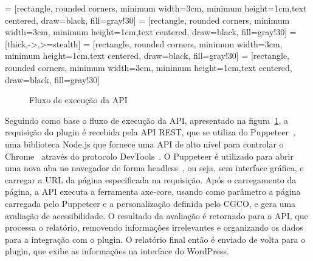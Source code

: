 \documentclass[
    12pt,
    a4paper,
    oneside,
    brazil,
    english
]{article}
\begin{document}
 = [rectangle, rounded corners, minimum width=3cm,
minimum height=1cm,text centered, draw=black, fill=gray!30]
 = [rectangle, rounded corners, minimum width=3cm,
minimum height=1cm,text centered, draw=black, fill=gray!30]
 = [thick,->,>=stealth]
 = [rectangle, rounded corners, minimum width=3cm,
minimum height=1cm,text centered, draw=black, fill=gray!30]
 = [rectangle, rounded corners, minimum width=3cm,
minimum height=1cm,text centered, draw=black, fill=gray!30]
\begin{figure}[ht]
    \centering
    \caption{Fluxo de execução da API}
    \label{fig:fluxo}
\end{figure}

Seguindo como base o fluxo de execução da API, apresentado na figura~\ref{fig:fluxo},
a requisição do plugin é recebida pela API REST, que se utiliza
do Puppeteer~\cite{puppeteer}, uma biblioteca Node.js que fornece uma
API de alto nível para controlar o Chrome~\cite{chrome} através do protocolo
DevTools~\cite{devtools}. O Puppeteer é utilizado para abrir uma nova aba no navegador de forma
headless~\cite{headless}, ou seja, sem interface gráfica, e carregar a URL da página
especificada na requisição. Após o carregamento da página, a API
executa a ferramenta axe-core, usando como parâmetro a página carregada
pelo Puppeteer e a personalização definida pelo CGCO, e gera uma avaliação
de acessibilidade. O resultado da avaliação é retornado para a API, que
processa o relatório, removendo informações irrelevantes e organizando os dados
para a integração com o plugin. O relatório final então é enviado de
volta para o plugin, que exibe as informações na interface do WordPress.
\end{document}
